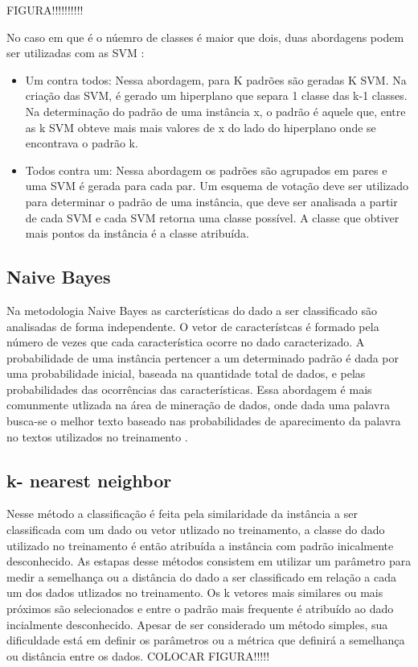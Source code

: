 FIGURA!!!!!!!!!!

No caso em que é o núemro de classes é maior que dois, duas abordagens podem ser utilizadas com as SVM \cite{Lorena03SVM}:
\begin{itemize}
\item{Um contra todos: }Nessa abordagem, para K padrões são geradas K SVM. Na criação das SVM, é gerado um hiperplano que separa 1 classe das k-1 classes. Na determinação do padrão de uma instância x, o padrão é aquele que, entre as k SVM obteve mais mais valores de x do lado do hiperplano onde se encontrava o padrão k.  
\item{Todos contra um: }Nessa abordagem os padrões são agrupados em pares e uma SVM é gerada para cada par. Um esquema de votação deve ser utilizado para determinar o padrão de uma instância, que deve ser analisada a partir de cada SVM e cada SVM retorna uma classe possível. A classe que obtiver mais pontos da instância é a classe atribuída.
\end{itemize}

\subsection{Naive Bayes}
Na metodologia Naive Bayes as carcterísticas do dado a ser classificado são analisadas de forma independente. O vetor de característcas é formado pela número de vezes que cada característica ocorre no dado caracterizado. A probabilidade de uma instância pertencer a um determinado padrão é dada por uma probabilidade inicial, baseada na quantidade total de dados, e pelas probabilidades das ocorrências das características. Essa abordagem é mais comunmente utlizada na área de mineração de dados, onde dada uma palavra busca-se o melhor texto baseado nas probabilidades de aparecimento da palavra no textos utilizados no treinamento \cite{McCallum98Bayes}\cite{Langley92Bayes}.

\subsection{k- nearest neighbor}
Nesse método a classificação é feita pela similaridade da instância a ser classificada com um dado ou vetor utlizado no treinamento, a classe do dado utilizado no treinamento é então atribuída a instância com padrão inicalmente desconhecido. As estapas desse métodos consistem em utilizar um parâmetro para medir a semelhança ou a distância do dado a ser classificado em relação a cada um dos dados utlizados no treinamento. Os k vetores mais similares ou mais próximos são selecionados e entre o padrão mais frequente é atribuído ao dado incialmente desconhecido. Apesar de ser considerado um método simples, sua dificuldade está em definir os parâmetros ou a métrica que definirá a semelhança ou distância entre os dados\cite{Chagas09KNN}.
COLOCAR FIGURA!!!!!



